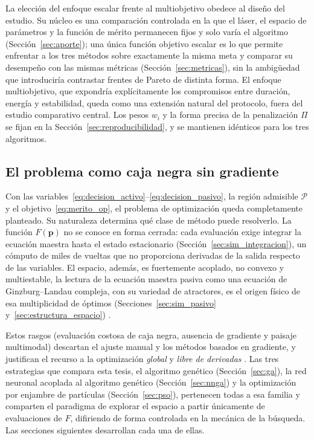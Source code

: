 La elección del enfoque escalar frente al multiobjetivo obedece al diseño del
estudio. Su núcleo es una comparación controlada en la que el láser, el espacio de
parámetros y la función de mérito permanecen fijos y solo varía el algoritmo
(Sección~\ref{sec:aporte}); una única función objetivo escalar es lo que permite
enfrentar a los tres métodos sobre exactamente la misma meta y comparar su
desempeño con las mismas métricas (Sección~\ref{sec:metricas}), sin la
ambigüedad que introduciría contrastar frentes de Pareto de distinta forma. El
enfoque multiobjetivo, que expondría explícitamente los compromisos entre duración,
energía y estabilidad, queda como una extensión natural del protocolo, fuera del
estudio comparativo central. Los pesos $w_i$ y la forma precisa de la penalización
$\Pi$ se fijan en la Sección~\ref{sec:reproducibilidad}, y se mantienen idénticos
para los tres algoritmos.

\subsection{El problema como caja negra sin gradiente}
\label{sec:caja_negra}

Con las variables~\eqref{eq:decision_activo}--\eqref{eq:decision_pasivo}, la región
admisible $\mathcal{P}$ y el objetivo~\eqref{eq:merito_op}, el problema de
optimización queda completamente planteado. Su naturaleza determina qué clase de
método puede resolverlo. La función $F(\mathbf{p})$ no se conoce en forma cerrada:
cada evaluación exige integrar la ecuación maestra hasta el estado estacionario
(Sección~\ref{sec:sim_integracion}), un cómputo de miles de vueltas que no
proporciona derivadas de la salida respecto de las variables. El espacio, además, es
fuertemente acoplado, no convexo y multiestable, la lectura de la ecuación maestra
pasiva como una ecuación de Ginzburg--Landau compleja, con su variedad de
atractores, es el origen físico de esa multiplicidad de óptimos
(Secciones~\ref{sec:sim_pasivo} y~\ref{sec:estructura_espacio})
\cite{Kaertner2020}.

Estos rasgos (evaluación costosa de caja negra, ausencia de gradiente y paisaje
multimodal) descartan el ajuste manual y los métodos basados en gradiente, y
justifican el recurso a la optimización \emph{global} y \emph{libre de derivadas}
\cite{Genty2021}. Las tres estrategias que compara esta tesis, el algoritmo genético
(Sección~\ref{sec:ga}), la red neuronal acoplada al algoritmo genético
(Sección~\ref{sec:nnga}) y la optimización por enjambre de partículas
(Sección~\ref{sec:pso}), pertenecen todas a esa familia y comparten el paradigma de
explorar el espacio a partir únicamente de evaluaciones de $F$, difiriendo de forma
controlada en la mecánica de la búsqueda. Las secciones siguientes desarrollan cada
una de ellas.


